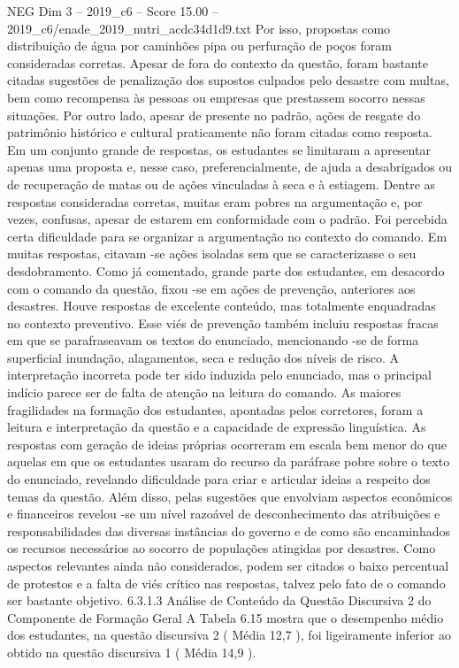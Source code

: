 \begin{textsample}{NEG Dim 3 – 2019\_c6 – Score 15.00 – 2019\_c6/enade\_2019\_nutri\_acdc34d1d9.txt}
Por isso, propostas como distribuição de água por caminhões pipa ou perfuração de poços foram consideradas corretas.
Apesar de fora do contexto da questão, foram bastante citadas sugestões de penalização dos supostos culpados pelo desastre com multas, bem como recompensa às pessoas ou empresas que prestassem socorro nessas situações.
Por outro lado, apesar de presente no padrão, ações de resgate do patrimônio histórico e cultural praticamente não foram citadas como resposta.
Em um conjunto grande de respostas, os estudantes se limitaram a apresentar apenas uma proposta e, nesse caso, preferencialmente, de ajuda a desabrigados ou de recuperação de matas ou de ações vinculadas à seca e à estiagem.
Dentre as respostas consideradas corretas, muitas eram pobres na argumentação e, por vezes, confusas, apesar de estarem em conformidade com o padrão.
Foi percebida certa dificuldade para se organizar a argumentação no contexto do comando.
Em muitas respostas, citavam -se ações isoladas sem que se caracterizasse o seu desdobramento.
Como já comentado, grande parte dos estudantes, em desacordo com o comando da questão, fixou -se em ações de prevenção, anteriores aos desastres.
Houve respostas de excelente conteúdo, mas totalmente enquadradas no contexto preventivo.
Esse viés de prevenção também incluiu respostas fracas em que se parafraseavam os textos do enunciado, mencionando -se de forma superficial inundação, alagamentos, seca e redução dos níveis de risco.
A interpretação incorreta pode ter sido induzida pelo enunciado, mas o principal indício parece ser de falta de atenção na leitura do comando.
As maiores fragilidades na formação dos estudantes, apontadas pelos corretores, foram a leitura e interpretação da questão e a capacidade de expressão linguística.
As respostas com geração de ideias próprias ocorreram em escala bem menor do que aquelas em que os estudantes usaram do recurso da paráfrase pobre sobre o texto do enunciado, revelando dificuldade para criar e articular ideias a respeito dos temas da questão.
Além disso, pelas sugestões que envolviam aspectos econômicos e financeiros revelou -se um nível razoável de desconhecimento das atribuições e responsabilidades das diversas instâncias do governo e de como são encaminhados os recursos necessários ao socorro de populações atingidas por desastres.
Como aspectos relevantes ainda não considerados, podem ser citados o baixo percentual de protestos e a falta de viés crítico nas respostas, talvez pelo fato de o comando ser bastante objetivo. 6.3.1.3 Análise de Conteúdo da Questão Discursiva 2 do Componente de Formação Geral A Tabela 6.15 mostra que o desempenho médio dos estudantes, na questão discursiva 2 ( Média 12,7 ), foi ligeiramente inferior ao obtido na questão discursiva 1 ( Média 14,9 ).

\end{textsample}
